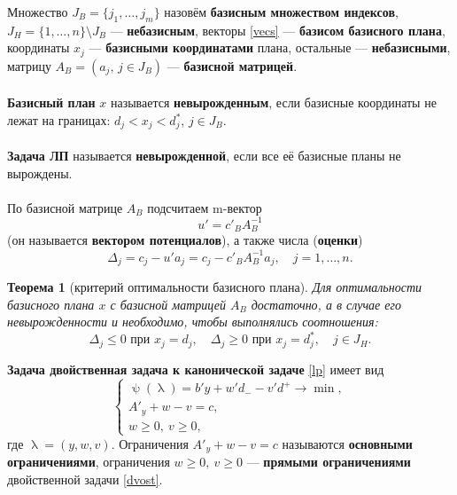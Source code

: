 \documentclass[a4paper, 12pt]{report}
\numberwithin{equation}{section}
\renewcommand{\leq}{\leqslant}
\renewcommand{\geq}{\geqslant}
\renewcommand{\lambda}{\uplambda}
\renewcommand{\psi}{\uppsi}
\newtheorem*{theorem}{Теорема}
\begin{document}
Множество $J_B = \{j_1, \ldots, j_m\}$ назовём \textbf{базисным множеством индексов}, $J_H = \{1, \ldots, n\} \setminus J_B$ --- \textbf{небазисным}, векторы \eqref{vecs} --- \textbf{базисом базисного плана}, координаты $x_j$ --- \textbf{базисными координатами} плана, остальные --- \textbf{небазисными}, матрицу $A_B = (a_j,\, j\in J_B)$ --- \textbf{базисной матрицей}.
\\\\
\textbf{Базисный план} $x$ называется \textbf{невырожденным}, если базисные координаты не лежат на границах: $d_j < x_j < d_j^*$, $j \in J_B$.
\\\\
\textbf{Задача ЛП} называется \textbf{невырожденной}, если все её базисные планы не вырождены.
\\\\
По базисной матрице $A_B$ подсчитаем m-вектор
\begin{equation}
\label{potencia}
    u' = c'_B A_B^{-1}
\end{equation}
(он называется \textbf{вектором потенциалов}), а также числа (\textbf{оценки})
\begin{equation}
\label{estimates}
    \Delta_j = c_j - u' a_j = c_j - c'_B A_B^{-1} a_j, \quad j = 1, \ldots, n.
\end{equation}
\begin{theorem}
    [критерий оптимальности базисного плана] Для оптимальности базисного плана $x$ с базисной матрицей $A_B$ достаточно, а в случае его невырожденности и необходимо, чтобы выполнялись соотношения:
\begin{equation}
    \Delta_j \leq 0 \text{ при } x_j = d_j, \quad \Delta_j \geq 0 \text{ при } x_j = d_j^*, \quad j \in J_H.
\end{equation}
\end{theorem}
\noindent
\textbf{Задача двойственная задача к канонической задаче} \eqref{lp} имеет вид
\begin{equation}
\label{dvost}
    \begin{cases}
        \psi(\lambda) = b' y + w' d_{-} - v' d^{+} \to \min,\\
        A'_y + w - v = c,\\
        w \geq 0,\ v \geq 0,
    \end{cases}
\end{equation}
где $\lambda = (y,w,v)$. Ограничения $A'_y + w - v = c$ называются \textbf{основными ограничениями}, ограничения $w \geq 0,\ v \geq 0$ --- \textbf{прямыми ограничениями} двойственной задачи \eqref{dvost}.
\end{document}
